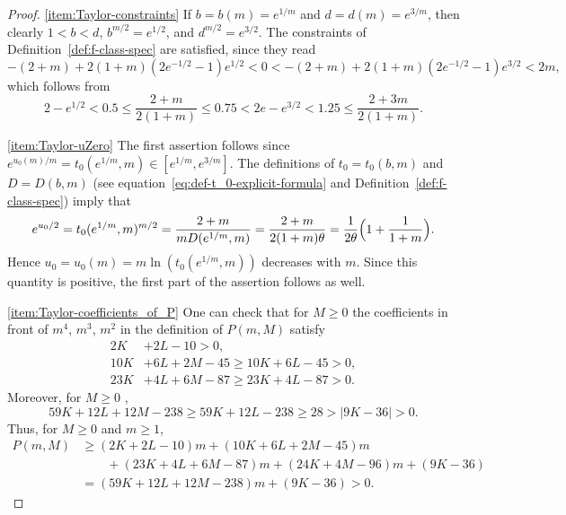 \documentclass[a4paper]{amsart} %
\theoremstyle{definition}
\theoremstyle{remark}
\numberwithin{equation}{section}
\newcommand*{\dOne}{D}%
\begin{document}
\begin{proof}
	\ref{item:Taylor-constraints}  
	If $b=b(m) = e^{1/m}$ and $d=d(m) = e^{3/m}$, then clearly 
	$1<b <d$, $b^{m/2} = e^{1/2}$, and $d^{m/2}  = e^{3/2}$.
	The constraints of Definition~\ref{def:f-class-spec} are satisfied,
	since they read 
	\begin{equation*}
	-(2+m) + 2(1+m) ( 2 e^{-1/2}  - 1 ) e^{1/2}  <  0  < -(2+m) + 2(1+m) ( 2 e^{-1/2}  - 1 ) e^{3/2} < 2m,
	\end{equation*}
	which follows from 
	\[ 2 - e^{1/2} < 0.5 \leq \frac{2+m}{2(1+m)} \leq 0.75 < 
	2 e  -  e^{3/2}  < 1.25 \leq \frac{2+3m}{2(1+m)}.
	\]
	
	\ref{item:Taylor-uZero} 
	The first assertion follows since 
	$ e^{u_0(m) /m} =  t_0(e^{1/m},m) \in [e^{1/m},e^{3/m}]$.
	The definitions of $t_0 = t_0(b,m)$ and $\dOne = \dOne(b,m)$ (see equation~\eqref{eq:def-t_0-explicit-formula} and Definition~\ref{def:f-class-spec}) imply that
	\begin{equation}
	\label{eq:def-u_0-formula}
	e^{u_0 /2} = t_0(e^{1/m},m)^{m/2} = \frac{2+m}{m\dOne(e^{1/m},m)} = \frac{2+m}{2(1+m)\theta}
	= \frac{1}{2\theta}\Bigl( 1 + \frac{1}{1+m} \Bigr).
	\end{equation}
	Hence $u_0 = u_0(m) = m\ln(t_0(e^{1/m},m))$ decreases with $m$.
	Since this quantity is positive, the first part of the assertion follows as well.
	
	\ref{item:Taylor-coefficients_of_P}
	One can check that for $M\geq 0$ the coefficients in front of $m^4$, $m^3$, $m^2$ in the definition of $P(m,M)$ satisfy 
	\begin{align*}
	2K & +2L -10 > 0,\\
	10K & +6L+2M -45 \geq 10K + 6L -45 >0,\\
	23 K & + 4 L +  6 M -87 \geq 23 K + 4 L  - 87 > 0.
	\end{align*}
	Moreover, for $M\geq 0$ , 
	\begin{equation*}
	59 K + 12 L +  12 M - 238\geq 59 K + 12 L- 238 \geq 28 > |9K - 36| >0.
	\end{equation*}
	Thus, for $M\geq 0$ and $m\geq 1$,
	\begin{align*}
	P(m,M) &\geq
	(2K+2L -10) m
	+ (10K+6L+2M -45) m\\
	&\qquad+ (23 K + 4 L +  6 M -87) m
	+ (24K + 4M - 96) m
	+ (9K - 36)\\
	&= (59 K + 12 L +  12 M - 238)m + (9K - 36) > 0.
	\end{align*}
	

\end{proof}
\end{document}
